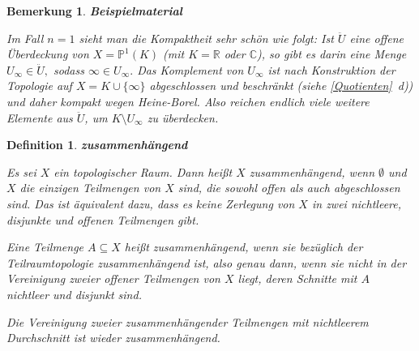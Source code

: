 \documentclass[12pt]{scrbook}   %
\newtheorem{bemX}[alles]{Bemerkung}
\newenvironment{bem}[1]{\begin{bemX}{\bf #1}\par\rm}{\end{bemX}}
\newtheorem{definiX}[alles]{Definition}
\newenvironment{defini}[1]{\begin{definiX}{\bf #1}\par\rm}{\end{definiX}}
\begin{document}
\begin{bem}{Beispielmaterial}
\begin{enumerate}[a)]
Im Fall $n=1$ sieht man die Kompaktheit sehr schön wie folgt: Ist $\ddot U$ 
eine offene Überdeckung von $X=\mathbb P^1(K)$ (mit $K=\mathbb R$ oder 
$\mathbb C$), so gibt es darin eine Menge $U_\infty\in \ddot U,$ sodass
$\infty\in U_\infty.$ Das Komplement von $U_\infty$ ist nach Konstruktion der
Topologie auf $X=K\cup\{\infty\}$ abgeschlossen und beschränkt (siehe 
\ref{Quotienten}~d)) und daher kompakt wegen Heine-Borel. Also reichen endlich viele
weitere Elemente aus $\ddot U$, um $K\setminus U_\infty$ zu überdecken.

\end{enumerate}

\end{bem}

\begin{defini}{zusammenhängend}\label{Zusammenhang} 
Es sei $X$ ein topologischer Raum. Dann heißt $X$ {\it 
zusammenhängend}, wenn $\emptyset$ und $X$ die 
einzigen Teilmengen von $X$ sind, die sowohl offen als auch abgeschlossen sind.
Das ist äquivalent dazu, dass es keine Zerlegung von $X$ in zwei nichtleere,
disjunkte und offenen Teilmengen gibt.

Eine Teilmenge $A\subseteq X$ heißt zusammenhängend, wenn sie bezüglich 
der
Teilraumtopologie zusammenhängend ist, also genau dann, wenn sie nicht 
in der Vereinigung zweier offener Teilmengen von $X$ liegt, deren Schnitte 
mit $A$ nichtleer und disjunkt sind.

Die Vereinigung zweier zusammenhängender Teilmengen mit nichtleerem
Durchschnitt ist wieder zusammenhängend.
\end{defini}
\end{document}

